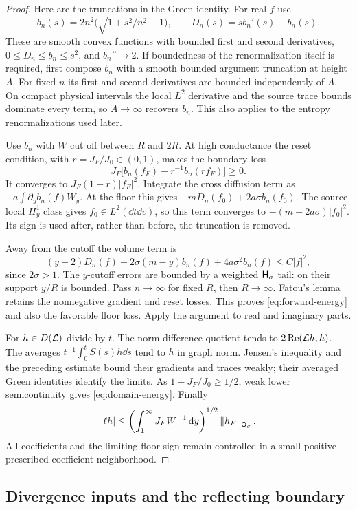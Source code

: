 \begin{proof}
Here are the truncations in the Green identity. For real $f$ use
\[
 b_n(s)=2n^2\bigl(\sqrt{1+s^2/n^2}-1\bigr),\qquad
 D_n(s)=s b_n'(s)-b_n(s).
\]
These are smooth convex functions with bounded first and second
derivatives, $0\le D_n\le b_n\le s^2$, and $b_n''\to2$. If boundedness of
the renormalization itself is required, first compose $b_n$ with a smooth
bounded argument truncation at height $A$. For fixed $n$ its first and
second derivatives are bounded independently of $A$. On compact physical
intervals the local $L^2$ derivative and the source trace bounds dominate
every term, so $A\to\infty$ recovers $b_n$. This also applies to the
entropy renormalizations used later.

Use $b_n$ with $W$ cut off between $R$ and $2R$. At high conductance the
reset condition, with $r=J_F/J_0\in(0,1)$, makes the boundary loss
\[
 J_F\bigl[b_n(f_F)-r^{-1}b_n(rf_F)\bigr]\ge0.
\]
It converges to $J_F(1-r)|f_F|^2$. Integrate the cross diffusion term as
$-a\int\partial_y b_n(f)W_y$. At the floor this gives
$-mD_n(f_0)+2a\sigma b_n(f_0)$. The source local $H^1_y$ class gives
$f_0\in L^2(\dd t\dd v)$, so this term converges to
$-(m-2a\sigma)|f_0|^2$. Its sign is used after, rather than before,
the truncation is removed.

Away from the cutoff the volume term is
\[
 (y+2)D_n(f)+2\sigma(m-y)b_n(f)+4a\sigma^2 b_n(f)
 \le C|f|^2,
\]
since $2\sigma>1$. The $y$-cutoff errors are bounded by a weighted
$\mathsf H_\sigma$ tail: on their support $y/R$ is bounded. Pass $n\to\infty$
for fixed $R$, then $R\to\infty$. Fatou's lemma retains the nonnegative
gradient and reset losses. This proves \eqref{eq:forward-energy} and also
the favorable floor loss. Apply the argument to real and imaginary parts.

For $h\in D(\mathcal L)$ divide by $t$. The norm difference quotient tends to
$2\operatorname{Re}(\mathcal L h,h)$. The averages
$t^{-1}\int_0^t S(s)h\dd s$ tend to $h$ in graph norm. Jensen's inequality
and the preceding estimate bound their gradients and traces weakly;
their averaged Green identities identify the limits. As
$1-J_F/J_0\ge1/2$, weak lower semicontinuity gives
\eqref{eq:domain-energy}. Finally
\[
 |\ell h|\le
 \left(\int_1^\infty J_FW^{-1}\,\mathrm d y\right)^{1/2}\left\|h_F\right\|_{\mathsf O_\sigma}.
\]
All coefficients and the limiting floor sign remain controlled in a
small positive prescribed-coefficient neighborhood.
\end{proof}

\subsection{Divergence inputs and the reflecting boundary}

